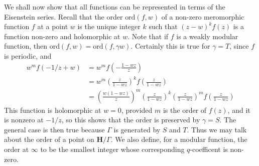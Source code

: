 We shall now show that all functions can be represented in terms of the Eisenstein series. Recall that the order $\text{ord}(f,w)$ of a non-zero meromorphic function $f$ at a point $w$ is the unique integer $k$ such that $(z - w)^k f(z)$ is a function non-zero and holomorphic at $w$. Note that if $f$ is a weakly modular function, then $\text{ord}(f,w) = \text{ord}(f, \gamma w)$. Certainly this is true for $\gamma = T$, since $f$ is periodic, and
%
\begin{align*}
    w^m f(-1/z + w) &= w^m f\left( -\frac{1-wz}{z} \right)\\
    &= w^m \left( \frac{z}{1 - wz} \right)^k f \left( \frac{z}{1 - wz} \right)\\
    &= \left( \frac{w (1 - wz)}{z} \right)^m \left( \frac{z}{1 - wz} \right)^k \left( \frac{z}{1 - wz} \right)^m f\left( \frac{z}{1 - wz} \right)
\end{align*}
%
This function is holomorphic at $w = 0$, provided $m$ is the order of $f(z)$, and it is nonzero at $-1/z$, so this shows that the order is preserved by $\gamma = S$. The general case is then true because $\Gamma$ is generated by $S$ and $T$. Thus we may talk about the order of a point on $\mathbf{H} / \Gamma$. We also define, for a modular function, the order at $\infty$ to be the smallest integer whose corresponding $q$-coefficent is non-zero.

